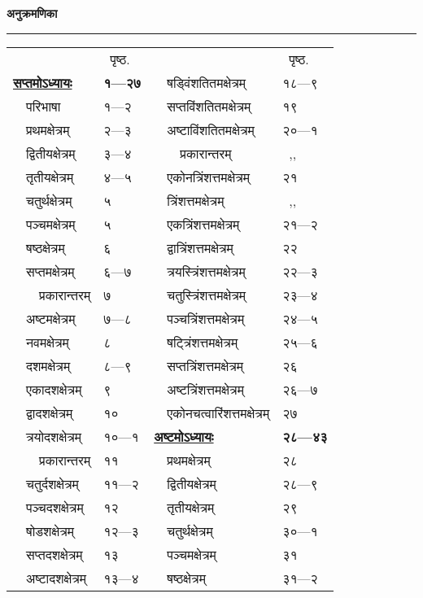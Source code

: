 \documentclass[11pt, openany]{book}
\begin{document}
\begin{center}
 \textbf{\Large अनुक्रमणिका}
\vspace{1mm}

\rule{1in}{0.5pt}
\end{center}
\begin{center}
\begin{tabular}{p{1.5in} l | p{1.5in} l}
& ~पृष्ठ.& & ~पृष्ठ.\\
\hyperref[ch7]{\textbf{सप्तमोऽध्यायः}} & \textbf{१---२७} & ~~षड्विंशतितमक्षेत्रम् & १८---९\\
~~परिभाषा & १---२ & ~~सप्तविंशतितमक्षेत्रम् & १९\\
~~प्रथमक्षेत्रम् & २---३ & ~~अष्टाविंशतितमक्षेत्रम् & २०---१\\
~~द्वितीयक्षेत्रम् & ३---४ & ~~~~प्रकारान्तरम् & ~,,\\
~~तृतीयक्षेत्रम् & ४---५ & ~~एकोनत्रिंशत्तमक्षेत्रम् & २१\\
~~चतुर्थक्षेत्रम् & ५ & ~~त्रिंशत्तमक्षेत्रम् & ~,,\\
~~पञ्चमक्षेत्रम् & ५ & ~~एकत्रिंशत्तमक्षेत्रम् & २१---२\\
~~षष्ठक्षेत्रम् & ६ & ~~द्वात्रिंशत्तमक्षेत्रम् & २२\\
~~सप्तमक्षेत्रम् & ६---७ & ~~त्रयस्त्रिंशत्तमक्षेत्रम् & २२---३\\
~~~~प्रकारान्तरम् & ७ & ~~चतुस्त्रिंशत्तमक्षेत्रम् & २३---४\\
~~अष्टमक्षेत्रम् & ७---८ & ~~पञ्चत्रिंशत्तमक्षेत्रम् & २४---५\\
~~नवमक्षेत्रम् & ८ & ~~षट्त्रिंशत्तमक्षेत्रम् & २५---६\\
~~दशमक्षेत्रम् & ८---९ & ~~सप्तत्रिंशत्तमक्षेत्रम् & २६\\
~~एकादशक्षेत्रम् & ९ & ~~अष्टत्रिंशत्तमक्षेत्रम् & २६---७\\
~~द्वादशक्षेत्रम् & १० & ~~एकोनचत्वारिंशत्तमक्षेत्रम् & २७\\
~~त्रयोदशक्षेत्रम् & १०---१ & \hyperref[ch8]{\textbf{अष्टमोऽध्यायः}} & \textbf{२८---४३}\\
~~~~प्रकारान्तरम् & ११ & ~~प्रथमक्षेत्रम् & २८\\
~~चतुर्दशक्षेत्रम् & ११---२ & ~~द्वितीयक्षेत्रम् & २८---९\\
~~पञ्चदशक्षेत्रम् & १२ & ~~तृतीयक्षेत्रम् & २९\\
~~षोडशक्षेत्रम् & १२---३ & ~~चतुर्थक्षेत्रम् & ३०---१\\
~~सप्तदशक्षेत्रम् & १३ & ~~पञ्चमक्षेत्रम् & ३१\\
~~अष्टादशक्षेत्रम् & १३---४ & ~~षष्ठक्षेत्रम् & ३१---२\\

\end{tabular}
\end{center}
\end{document}
